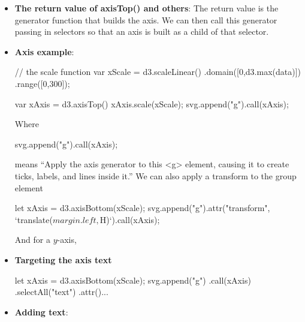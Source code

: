 \documentclass{report}
\begin{document}
\begin{itemize}
\begin{itemize}
            \end{itemize}
        \item \textbf{The return value of axisTop() and others}: The return value is the generator function that builds the axis.
            \bigbreak \noindent 
            We can then call this generator passing in selectors so that an axis is built as a child of that selector.
        \item \textbf{Axis example}: 
            \bigbreak \noindent 
            \begin{jscode}
            // the scale function
            var xScale = d3.scaleLinear()
              .domain([0,d3.max(data)])
              .range([0,300]);

            var xAxis = d3.axisTop()
            xAxis.scale(xScale);
            svg.append("g").call(xAxis);
            \end{jscode}
            \bigbreak \noindent 
            Where 
            \bigbreak \noindent 
            \begin{jscode}
                svg.append("g").call(xAxis);
            \end{jscode}
            \bigbreak \noindent 
            means “Apply the axis generator to this <g> element, causing it to create ticks, labels, and lines inside it.”
            \bigbreak \noindent 
            We can also apply a transform to the group element
            \bigbreak \noindent 
            \begin{jscode}
                let xAxis = d3.axisBottom(xScale);
                svg.append("g").attr("transform", `translate(${margin.left},${H})`).call(xAxis);
            \end{jscode}
            \bigbreak \noindent 
            And for a $y$-axis,
            \bigbreak \noindent 
        \item \textbf{Targeting the axis text}
            \bigbreak \noindent 
            \begin{cppcode}
                let xAxis = d3.axisBottom(xScale);
                svg.append("g")
                    .call(xAxis)
                    .selectAll("text")
                    .attr()...
            \end{cppcode}
        \item \textbf{Adding text}: 

\end{itemize}
\end{document}
